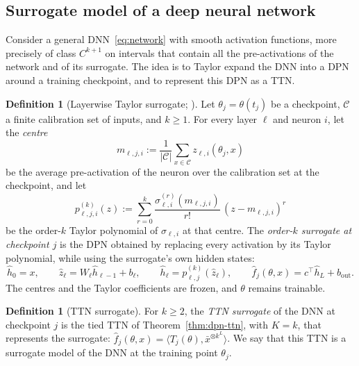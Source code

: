 \documentclass[11pt]{article}
\newcommand{\ip}[2]{\langle #1,#2\rangle}
\newcommand{\xb}{\bar{x}}
\newcommand{\fhat}{\hat f}
\theoremstyle{definition}
\newtheorem{definition}[theorem]{Definition}
\numberwithin{equation}{section}
\begin{document}
\subsection{Surrogate model of a deep neural network}\label{sec:surrogate}

Consider a general DNN~\eqref{eq:network} with smooth activation functions, more precisely of class $C^{k+1}$ on intervals that contain all the pre-activations of the network and of its surrogate. The idea is to Taylor expand the DNN into a DPN around a training checkpoint, and to represent this DPN as a TTN.

\begin{definition}[Layerwise Taylor surrogate; {\citealp[Section~2.2]{hfl_local}}]\label{def:taylor-surrogate}
Let $\theta_j=\theta(t_j)$ be a checkpoint, $\mathcal C$ a finite calibration set of inputs, and $k\ge1$. For every layer $\ell$ and neuron $i$, let the \emph{centre}
\[
m_{\ell,j,i}:=\frac1{|\mathcal C|}\sum_{x\in\mathcal C}z_{\ell,i}(\theta_j,x)
\]
be the average pre-activation of the neuron over the calibration set at the checkpoint, and let
\[
p^{(k)}_{\ell,j,i}(z):=\sum_{r=0}^k\frac{\sigma_{\ell,i}^{(r)}(m_{\ell,j,i})}{r!}\,(z-m_{\ell,j,i})^r
\]
be the order-$k$ Taylor polynomial of $\sigma_{\ell,i}$ at that centre. The \emph{order-$k$ surrogate at checkpoint $j$} is the DPN obtained by replacing every activation by its Taylor polynomial, while using the surrogate's own hidden states:
\[
\hat h_0=x,\qquad\hat z_\ell=W_\ell\hat h_{\ell-1}+b_\ell,\qquad\hat h_\ell=p^{(k)}_{\ell,j}(\hat z_\ell),\qquad\fhat_j(\theta,x)=c^\top\hat h_L+b_{\mathrm{out}}.
\]
The centres and the Taylor coefficients are frozen, and $\theta$ remains trainable.
\end{definition}

\begin{definition}[TTN surrogate]\label{def:ttn-surrogate}
For $k\ge2$, the \emph{TTN surrogate} of the DNN at checkpoint $j$ is the tied TTN of Theorem~\ref{thm:dpn-ttn}, with $K=k$, that represents the surrogate: $\fhat_j(\theta,x)=\ip{T_j(\theta)}{\xb^{\otimes k^L}}$. We say that this TTN is a surrogate model of the DNN at the training point $\theta_j$.
\end{definition}
\end{document}
